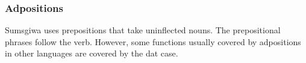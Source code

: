 \subsubsection{Adpositions}
Sumsgiwa uses prepositions that take uninflected nouns. The prepositional phrases follow the verb. However, some functions usually covered by adpositions in other languages are covered by the \acrlong{dat} case.
